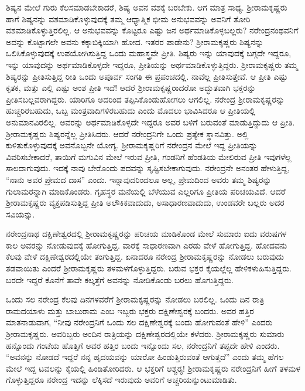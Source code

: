 ಶಿಷ್ಯನ ಮೇಲೆ ಗುರು ಕೆಲಸಮಾಡಬೇಕಾದರೆ, ಶಿಷ್ಯ ಅವನ ವಶಕ್ಕೆ ಬರಬೇಕು. ಆಗ ಮಾತ್ರ ಸಾಧ್ಯ. ಶ‍್ರೀರಾಮಕೃಷ್ಣರು ಹಾಗೆ ಶಿಷ್ಯನನ್ನು ವಶಮಾಡಿಕೊಳ್ಳುವುದಕ್ಕೆ ತಮ್ಮ ಆಧ್ಯಾತ್ಮಿಕ ಭೀಮ ಅನುಭವವನ್ನು ಅವನಿಗೆ ತೋರಿ ವಶಮಾಡಿಕೊಳ್ಳುತ್ತಿರಲಿಲ್ಲ. ಆ ಅನುಭವವನ್ನು ಕೊಟ್ಟರೂ ಎಷ್ಟು ಜನ ಅರ್ಥಮಾಡಿಕೊಳ್ಳಬಲ್ಲರು? ನರೇಂದ್ರನಂಥವನಿಗೆ ಅದನ್ನು ಕೊಟ್ಟಾಗಲೇ ಅವನು ಕಕ್ಕಾಬಿಕ್ಕಿಯಾಗಿ ಹೋದ. ಇತರರ ಪಾಡೇನು? ಶ‍್ರೀರಾಮಕೃಷ್ಣರು ಶಿಷ್ಯನನ್ನು ಒಲಿಸಿಕೊಳ್ಳುವುದಕ್ಕೆ ಉಪಯೋಗಿಸುತ್ತಿದ್ದ ಒಂದು ಮಹಾಸ್ತ್ರವೇ ಪ್ರೀತಿ. ಶಿಷ್ಯರು ಇನ್ನು ಯಾವುದಕ್ಕೆ ಬಗ್ಗದೇ ಇದ್ದರೂ, ಇನ್ನು ಯಾವುದನ್ನು ಅರ್ಥಮಾಡಿಕೊಳ್ಳದೇ ಇದ್ದರೂ, ಪ್ರೀತಿಯನ್ನು ಅರ್ಥಮಾಡಿಕೊಳ್ಳುತ್ತಿದ್ದರು. ಶ‍್ರೀರಾಮಕೃಷ್ಣರು ತಮ್ಮ ಶಿಷ್ಯರನ್ನು ಪ್ರೀತಿಸುತ್ತಿದ್ದ ರೀತಿ ಒಂದು ಅಪೂರ್ವ ಸಂಗತಿ ಈ ಪ್ರಪಂಚದಲ್ಲಿ. ನಾವೆಲ್ಲ ಪ್ರೀತಿಸುತ್ತೇವೆ. ಆ ಪ್ರೀತಿ ಎಷ್ಟು ಕೃತಕ, ಮತ್ತು ಎಲ್ಲಿ ಎಷ್ಟು ಅಂಶ ಪ್ರೀತಿ ಇದೆ! ಆದರೆ ಶ‍್ರೀರಾಮಕೃಷ್ಣರಾದರೋ ಅದ್ಭುತವಾಗಿ ಭಕ್ತರನ್ನು ಪ್ರೀತಿಸಬಲ್ಲವರಾಗಿದ್ದರು. ಯಾರಿಗೂ ಅದರಿಂದ ತಪ್ಪಿಸಿಕೊಂಡುಹೋಗಲು ಆಗಲಿಲ್ಲ. ನರೇಂದ್ರ ಶ‍್ರೀರಾಮಕೃಷ್ಣರನ್ನು ಹುಚ್ಚರಿರಬಹುದು, ಒಬ್ಬ ಮಂತ್ರವಾದಿಗಳಿರಬಹುದು ಎಂದು ಮೊದಲು ಭಾವಿಸಿದರೂ ಆ ಪ್ರೀತಿಯಲ್ಲಿ ಅನುಮಾನವಿರಲಿಲ್ಲ. ಅವರನ್ನು ಅರ್ಥಮಾಡಿಕೊಳ್ಳದೇ ಇದ್ದರೂ ಅವರ ಬಳಿಗೆ ಬರುವಂತೆ ಮಾಡುತ್ತಿದ್ದುದು ಆ ಪ್ರೀತಿ. ಶ‍್ರೀರಾಮಕೃಷ್ಣರು ಶಿಷ್ಯರನ್ನೆಲ್ಲ ಪ್ರೀತಿಸಿದರು. ಆದರೆ ನರೇಂದ್ರನಿಗೇ ಒಂದು ಪ್ರತ್ಯೇಕ ಸ್ಥಾನವಿತ್ತು. ಅಲ್ಲಿ ಕುಳಿತುಕೊಳ್ಳುವುದಕ್ಕೆ ಅವನೊಬ್ಬನೇ ಯೋಗ್ಯ. ಶ‍್ರೀರಾಮಕೃಷ್ಣರಿಗೆ ನರೇಂದ್ರನ ಮೇಲೆ ಇದ್ದ ಪ್ರೀತಿಯನ್ನು ವಿವರಿಸಬೇಕಾದರೆ, ತಾಯಿಗೆ ಮಗುವಿನ ಮೇಲೆ ಇರುವ ಪ್ರೀತಿ, ಗಂಡನಿಗೆ ಹೆಂಡತಿಯ ಮೇಲಿರುವ ಪ್ರೀತಿ ಇವುಗಳೆಲ್ಲ ಸಾಲದಾಗುವುದು. ಇದಕ್ಕೆ ನಾವು ಬೇರೊಂದು ಪದವನ್ನು ಸೃಷ್ಟಿಸಬೇಕಾಗುವುದು. ನರೇಂದ್ರನೇ ಅನಂತರ ಹೇಳುತ್ತಿದ್ದ, “ನಾನು ಅವರ ಪ್ರೇಮದ ದಾಸ” ಎಂದು. ಇನ್ನಾವುದರಿಂದಲೂ ಅಲ್ಲ, ಪ್ರೇಮದಿಂದ ಅವರು ತಮ್ಮ ಶಿಷ್ಯರನ್ನು ಗುಲಾಮರನ್ನಾಗಿ ಮಾಡಿಕೊಂಡರು. ಗೃಹಸ್ಥರ ಮನೆಯಲ್ಲಿ ಬೆಳೆಯುವ ಎಲ್ಲರಿಗೂ ಪ್ರೀತಿಯ ಪರಿಚಯವಿದೆ. ಆದರೆ ಶ‍್ರೀರಾಮಕೃಷ್ಣರು ವ್ಯಕ್ತಪಡಿಸುತ್ತಿದ್ದ ಪ್ರೀತಿ ಅಲೌಕಿಕವಾದುದು, ಅಸಾಧಾರಣವಾದುದು, ಉಂಡವರೇ ಬಲ್ಲರು ಅದರ ಸವಿಯನ್ನು.

ನರೇಂದ್ರನಾಥ ದಕ್ಷಿಣೇಶ್ವರದಲ್ಲಿ ಶ‍್ರೀರಾಮಕೃಷ್ಣರನ್ನು ಪರಿಚಯ ಮಾಡಿಕೊಂಡ ಮೇಲೆ ಸುಮಾರು ಐದು ವರುಷಗಳ ಕಾಲ ಅವರನ್ನು ನೋಡುವುದಕ್ಕೆ ಹೋಗುತ್ತಿದ್ದ. ವಾರಕ್ಕೆ ಸಾಧಾರಣವಾಗಿ ಎರಡು ವೇಳೆ ಹೋಗುತ್ತಿದ್ದ. ಹೋದವನು ಕೆಲವು ವೇಳೆ ದಕ್ಷಿಣೇಶ್ವರದಲ್ಲಿಯೇ ತಂಗುತ್ತಿದ್ದ. ಏನಾದರೂ ನರೇಂದ್ರ ಶ‍್ರೀರಾಮಕೃಷ್ಣರನ್ನು ನೋಡಲು ಬರುವುದು ತಡವಾಯಿತು ಎಂದರೆ ಶ‍್ರೀರಾಮಕೃಷ್ಣರು ತಳಮಳಗೊಳ್ಳುತ್ತಿದ್ದರು. ಬರುವ ಭಕ್ತರ ಕೈಯಲ್ಲೆಲ್ಲ ಹೇಳಿಕಳುಹಿಸುತ್ತಿದ್ದರು. ಬರದೇ ಇದ್ದರೆ ಕೊನೆಗೆ ತಾವೇ ಕಲ್ಕತ್ತೆಗೆ ಅವನನ್ನು ನೋಡಿಕೊಂಡು ಬರಲು ಹೊಗುತ್ತಿದ್ದರು.

ಒಂದು ಸಲ ನರೇಂದ್ರ ಕೆಲವು ದಿನಗಳವರೆಗೆ ಶ‍್ರೀರಾಮಕೃಷ್ಣರನ್ನು ನೋಡಲು ಬರಲಿಲ್ಲ. ಒಂದು ದಿನ ರಾತ್ರಿ ರಾಮದಯಾಳು ಮತ್ತು ಬಾಬುರಾಮ ಎಂಬ ಇಬ್ಬರು ಭಕ್ತರು ದಕ್ಷಿಣೇಶ್ವರಕ್ಕೆ ಬಂದರು. ಅವರ ಹತ್ತಿರ ಮಾತನಾಡುವಾಗ, “ನೀವು ನರೇಂದ್ರನಿಗೆ ಒಂದು ಸಲ ದಕ್ಷಿಣೇಶ್ವರಕ್ಕೆ ಬಂದು ಹೋಗುವಂತೆ ಹೇಳಿ” ಎಂದರು ಶ‍್ರೀರಾಮಕೃಷ್ಣರು. ಅವರಿಬ್ಬರು ಅಂದಿನ ರಾತ್ರಿಯನ್ನು ದಕ್ಷಿಣೇಶ್ವರದಲ್ಲಿಯೇ ಕಳೆದರು. ಶ‍್ರೀರಾಮಕೃಷ್ಣರು ಸುಮಾರು ಹನ್ನೊಂದು ಗಂಟೆಯ ಹೊತ್ತಿಗೆ ಅವರ ಹತ್ತಿರ ಬಂದು ಇನ್ನೊಂದು ಸಲ, ನರೇಂದ್ರನಿಗೆ ತಪ್ಪದೇ ಹೇಳಿ ಎಂದರು. “ಅವನನ್ನು ನೋಡದೆ ಇದ್ದರೆ ನನ್ನ ಹೃದಯವನ್ನು ಯಾರೋ ಹಿಂಡುತ್ತಿರುವಂತೆ ಆಗುತ್ತದೆ” ಎಂದು ತಮ್ಮ ಹೆಗಲ ಮೇಲೆ ಇದ್ದ ಟವಲನ್ನು ಕೈಯಲ್ಲಿ ಹಿಂಡಿತೋರಿದರು. ಆ ಭಕ್ತರಿಗೆ ಆಶ್ಚರ‍್ಯ! ಶ‍್ರೀರಾಮಕೃಷ್ಣರು ನರೇಂದ್ರನಿಗೆ ಹೀಗೆ ತಳಮಳ ಗೊಳ್ಳುತ್ತಿದ್ದರೂ ನರೇಂದ್ರ ಇದನ್ನು ಲೆಕ್ಕಿಸದೆ ಇರುವುದು ಅವರಿಗೆ ಅಚ್ಚರಿಯನ್ನುಂಟುಮಾಡಿತು.

